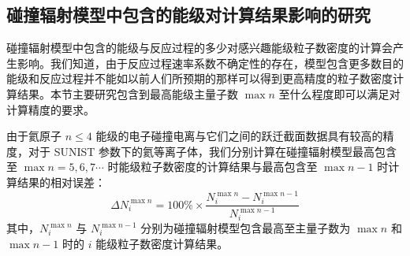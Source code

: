 \subsection{碰撞辐射模型中包含的能级对计算结果影响的研究}
\label{sec:chap03:maxn-in-crm}

碰撞辐射模型中包含的能级与反应过程的多少对感兴趣能级粒子数密度的计算会产生影响。我们知道，由于反应过程速率系数不确定性的存在，模型包含更多数目的能级和反应过程并不能如以前人们所预期的那样可以得到更高精度的粒子数密度计算结果。本节主要研究包含到最高能级主量子数 $\max n$ 至什么程度即可以满足对计算精度的要求。

由于氦原子 $n\le4$ 能级的电子碰撞电离与它们之间的跃迁截面数据具有较高的精度，对于 SUNIST 参数下的氦等离子体，我们分别计算在碰撞辐射模型最高包含至 $\max n=5, 6, 7 \cdots$ 时能级粒子数密度的计算结果与最高包含至 $\max n-1$ 时计算结果的相对误差：
\begin{equation}
\Delta N_i^{\max n}=100\%\times\frac{N_i^{\max n}-N_i^{\max n-1}}{N_i^{\max n-1}}
\label{eq:chap03:rel-diff-maxn}
\end{equation}
其中，$N_i^{\max n}$ 与 $N_i^{\max n-1}$ 分别为碰撞辐射模型包含最高至主量子数为 $\max n$ 和  $\max n-1$ 时的 $i$ 能级粒子数密度计算结果。

